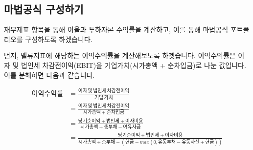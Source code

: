 \documentclass[12pt,]{book}
\begin{document}
\hypertarget{section-64}{%
\subsection{마법공식 구성하기}\label{section-64}}

재무제표 항목을 통해 이율과 투하자본 수익률을 계산하고, 이를 통해 마법공식 포트폴리오를 구성하도록 하겠습니다.

먼저, 밸류지표에 해당하는 이익수익률을 계산해보도록 하겟습니다. 이익수익률은 이자 및 법인세 차감전이익(EBIT)을 기업가치(시가총액 + 순차입금)로 나눈 값입니다. 이를 분해하면 다음과 같습니다.

\begin{small}
\begin{equation*} 
\begin{split}
 이익수익률 & = \frac{이자\,및\,법인세\,차감전이익}{기업\,가치} \\
& = \frac{이자\,및\,법인세\,차감전이익}{시가총액 + 순차입금} \\
& = \frac{당기순이익 + 법인세 + 이자비용}{시가총액 + 총부채 - 여유자금} \\
& = \frac{당기순이익 + 법인세 + 이자비용}{시가총액 + 총부채 - (현금 - max(0, 유동부채 - 유동자산 + 현금))}
\end{split}
\end{equation*} 
\end{small}
\end{document}

